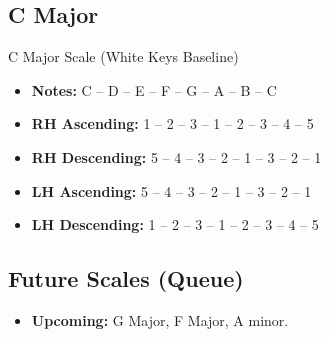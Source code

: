 \subsection{C Major}
\begin{definitionbox}{C Major Scale (White Keys Baseline)}
\begin{itemize}
    \item \textbf{Notes:} C -- D -- E -- F -- G -- A -- B -- C
    \item \textbf{RH Ascending:} 1 -- 2 -- 3 -- 1 -- 2 -- 3 -- 4 -- 5
    \item \textbf{RH Descending:} 5 -- 4 -- 3 -- 2 -- 1 -- 3 -- 2 -- 1
    \item \textbf{LH Ascending:} 5 -- 4 -- 3 -- 2 -- 1 -- 3 -- 2 -- 1
    \item \textbf{LH Descending:} 1 -- 2 -- 3 -- 1 -- 2 -- 3 -- 4 -- 5
\end{itemize}
\end{definitionbox}

\subsection{Future Scales (Queue)}
\begin{itemize}
    \item \textbf{Upcoming:} G Major, F Major, A minor.
\end{itemize}
